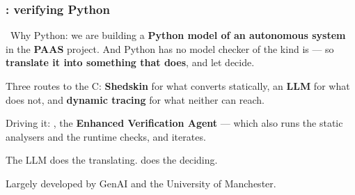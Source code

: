 \begin{frame}
  \frametitle{\esbmcpy{}: verifying Python} \small

\newtag{} \ Why Python: we are building a {\bf Python model of an autonomous system}
in the {\bf PAAS} project. And Python has no model checker of the kind \spin{} is ---
so {\bf translate it into something that does}, and let \esbmc{} decide.

\vspace{0.35cm}

{\centering
{}\par}

\vspace{0.35cm}

Three routes to the C: {\bf Shedskin} for what converts statically, an {\bf LLM} for
what does not, and {\bf dynamic tracing} for what neither can reach.

\vspace{0.2cm}

Driving it: \ours{\eva{}}, the {\bf Enhanced Verification Agent} --- which also runs
the static analysers and the runtime checks, and iterates.

\vspace{0.2cm}

\begin{block}{}\small
\centering
The LLM does the translating. \esbmc{} does the deciding.
\end{block}

\vspace{0.25cm}

{\scriptsize Largely developed by GenAI and the University of Manchester.}

\end{frame}
